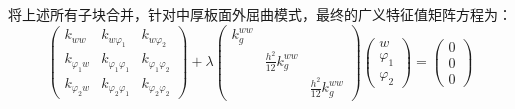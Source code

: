 将上述所有子块合并，针对中厚板面外屈曲模式，最终的广义特征值矩阵方程为：
\begin{equation}
\begin{pmatrix}
k_{ww} & k_{w\varphi_1} & k_{w\varphi_2} \\
k_{\varphi_1 w} & k_{\varphi_1\varphi_1} & k_{\varphi_1\varphi_2} \\
k_{\varphi_2 w} & k_{\varphi_2\varphi_1} & k_{\varphi_2\varphi_2}
\end{pmatrix}
+ \lambda
\begin{pmatrix}
k_g^{ww} & & \\
& \frac{h^2}{12}k_g^{ww} & \\
& & \frac{h^2}{12}k_g^{ww}
\end{pmatrix}
\begin{pmatrix} w \\ \varphi_1 \\ \varphi_2 \end{pmatrix}
= \begin{pmatrix} 0 \\ 0 \\ 0 \end{pmatrix}
\end{equation}


